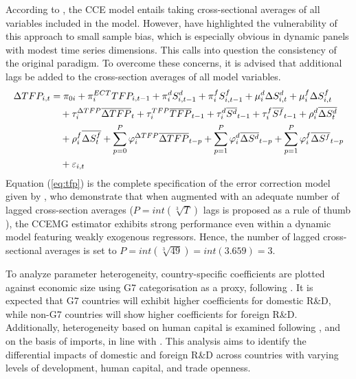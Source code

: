 \documentclass[12pt]{article}
\begin{document}
According to \citet{Pesaran2006}, the CCE model entails taking cross-sectional averages of all variables included in the model. However, \citet{Chudik2015} have highlighted the vulnerability of this approach to small sample bias, which is especially obvious in dynamic panels with modest time series dimensions. This calls into question the consistency of the original \citet{Pesaran2006} paradigm. To overcome these concerns, it is advised that additional lags be added to the cross-section averages of all model variables. 
\begin{align}
    \Delta TFP_{i,t} &= \pi_{0i} + \pi_i^{ECT} TFP_{i,t-1} + \pi_i^d S_{i, t-1}^d + \pi_i^f S_{i, t-1}^f + \mu_i^d \Delta S_{i,t}^d  + \mu_i^f \Delta S_{i,t}^f \notag \\
    &\quad + \tau_i^{\Delta TFP} \overline{\Delta TFP}_{t} + \tau_i^{TFP} \overline{TFP}_{t-1} + \tau_i^d \overline{S^d}_{t-1} + \tau_i^f \overline{S^f}_{t-1}+ \rho_i^d \overline{\Delta S^d_t}  \notag \\
    &\quad + \rho_i^f \overline{\Delta S^f_t} + \sum_{p=0}^P \varphi_i^{\Delta TFP} \overline{\Delta TFP}_{t-p} + \sum_{p=1}^P \varphi_i^d \overline{\Delta S^d}_{t-p} + \sum_{p=1}^P \varphi_i^f \overline{\Delta S^f}_{t-p} \notag \\
    &\quad  + \varepsilon_{i,t} \label{eq:tfp}
\end{align}
Equation (\ref{eq:tfp}) is the complete specification of the error correction model given by \citet{Chudik2015}, who demonstrate that when augmented with an adequate number of lagged cross-section averages ($P=int(\sqrt[3]{T})$ lags is proposed as a rule of thumb \citep{Eberhardt2015}), the CCEMG estimator exhibits strong performance even within a dynamic model featuring weakly exogenous regressors. Hence, the number of lagged cross-sectional averages is set to $P=int(\sqrt[3]{49})=int(3.659)=3$.

To analyze parameter heterogeneity, country-specific coefficients are plotted against economic size using G7 categorisation as a proxy, following \citet{Coe1995}. It is expected that G7 countries will exhibit higher coefficients for domestic R\&D, while non-G7 countries will show higher coefficients for foreign R\&D. Additionally, heterogeneity based on human capital is examined following \citet{Coe2009}, and on the basis of imports, in line with \citet{Lichtenberg1998}. This analysis aims to identify the differential impacts of domestic and foreign R\&D across countries with varying levels of development, human capital, and trade openness. 
\end{document}
